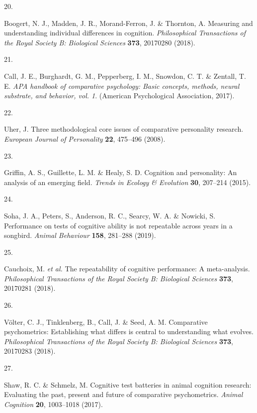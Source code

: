 \documentclass[
  man,floatsintext]{apa6}
\newlength{\cslhangindent}
\newlength{\csllabelwidth}
\newlength{\cslentryspacingunit} %
\newenvironment{CSLReferences}[2] %
 {%
  \setlength{\parindent}{0pt}
  \ifodd #1
  \let\oldpar\par
  \def\par{\hangindent=\cslhangindent\oldpar}
  \fi
  \setlength{\parskip}{#2\cslentryspacingunit}
 }%
 {}
\newcommand{\CSLLeftMargin}[1]{\parbox[t]{\csllabelwidth}{#1}}
\newcommand{\CSLRightInline}[1]{\parbox[t]{\linewidth - \csllabelwidth}{#1}\break}
\begin{document}
\begin{CSLReferences}{0}{0}
\leavevmode{}%
\CSLLeftMargin{20. }%
\CSLRightInline{Boogert, N. J., Madden, J. R., Morand-Ferron, J. \& Thornton, A. Measuring and understanding individual differences in cognition. \emph{Philosophical Transactions of the Royal Society B: Biological Sciences} \textbf{373}, 20170280 (2018).}

\leavevmode{}%
\CSLLeftMargin{21. }%
\CSLRightInline{Call, J. E., Burghardt, G. M., Pepperberg, I. M., Snowdon, C. T. \& Zentall, T. E. \emph{APA handbook of comparative psychology: Basic concepts, methods, neural substrate, and behavior, vol. 1}. (American Psychological Association, 2017).}

\leavevmode{}%
\CSLLeftMargin{22. }%
\CSLRightInline{Uher, J. Three methodological core issues of comparative personality research. \emph{European Journal of Personality} \textbf{22}, 475--496 (2008).}

\leavevmode{}%
\CSLLeftMargin{23. }%
\CSLRightInline{Griffin, A. S., Guillette, L. M. \& Healy, S. D. Cognition and personality: An analysis of an emerging field. \emph{Trends in Ecology \& Evolution} \textbf{30}, 207--214 (2015).}

\leavevmode{}%
\CSLLeftMargin{24. }%
\CSLRightInline{Soha, J. A., Peters, S., Anderson, R. C., Searcy, W. A. \& Nowicki, S. Performance on tests of cognitive ability is not repeatable across years in a songbird. \emph{Animal Behaviour} \textbf{158}, 281--288 (2019).}

\leavevmode{}%
\CSLLeftMargin{25. }%
\CSLRightInline{Cauchoix, M. \emph{et al.} The repeatability of cognitive performance: A meta-analysis. \emph{Philosophical Transactions of the Royal Society B: Biological Sciences} \textbf{373}, 20170281 (2018).}

\leavevmode{}%
\CSLLeftMargin{26. }%
\CSLRightInline{Völter, C. J., Tinklenberg, B., Call, J. \& Seed, A. M. Comparative psychometrics: Establishing what differs is central to understanding what evolves. \emph{Philosophical Transactions of the Royal Society B: Biological Sciences} \textbf{373}, 20170283 (2018).}

\leavevmode{}%
\CSLLeftMargin{27. }%
\CSLRightInline{Shaw, R. C. \& Schmelz, M. Cognitive test batteries in animal cognition research: Evaluating the past, present and future of comparative psychometrics. \emph{Animal Cognition} \textbf{20}, 1003--1018 (2017).}


\end{CSLReferences}
\end{document}
